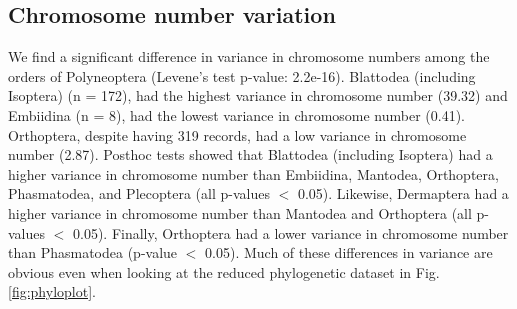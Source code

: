 \documentclass[]{rsos}%
\begin{document}
\subsection{Chromosome number variation}
We find a significant difference in variance in chromosome numbers among the orders of Polyneoptera (Levene's test p-value: 2.2e-16). 
Blattodea (including Isoptera) (n = 172), had the highest variance in chromosome number (39.32) and  Embiidina (n = 8), had the lowest variance in chromosome number (0.41).
Orthoptera, despite having 319 records, had a low variance in chromosome number (2.87). 
Posthoc tests showed that Blattodea (including Isoptera) had a higher variance in chromosome number than Embiidina, Mantodea, Orthoptera, Phasmatodea, and Plecoptera (all p-values $<$ 0.05). 
Likewise, Dermaptera had a higher variance in chromosome number than Mantodea and Orthoptera (all p-values $<$ 0.05). Finally, Orthoptera had a lower variance in chromosome number than Phasmatodea (p-value $<$ 0.05).
Much of these differences in variance are obvious even when looking at the reduced phylogenetic dataset in Fig. \ref{fig:phyloplot}.
\end{document}
